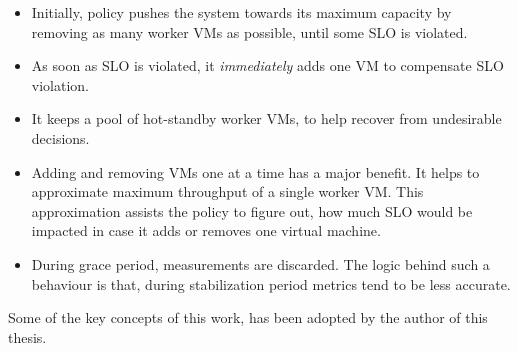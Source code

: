 \begin{itemize}
\item Initially, policy pushes the system towards its maximum capacity by removing as many worker VMs as possible, until some SLO is violated.
\item As soon as SLO is violated, it \emph{immediately} adds one VM to compensate SLO violation.
\item It keeps a pool of hot-standby worker VMs, to help recover from undesirable decisions.
\item Adding and removing VMs one at a time has a major benefit. It helps to approximate maximum throughput of a single worker VM. This approximation assists the policy to figure out, how much SLO would be impacted in case it adds or removes one virtual machine.
\item During grace period, measurements are discarded. The logic behind such a behaviour is that, during stabilization period metrics tend to be less accurate.
\end{itemize}
Some of the key concepts of this work, has been adopted by the author of this thesis.\newline

\textcite{Heinze:2015} 